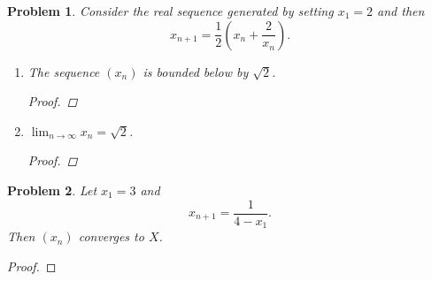\documentclass[12pt]{article}
\newtheorem{problem}{Problem}
\begin{document}
\begin{problem} %
Consider the real sequence generated by setting $x_1=2$ and then
	$$x_{n+1} = \frac{1}{2}\left(x_n + \frac{2}{x_n}\right).$$


\renewcommand{\labelenumi}{(\alph{enumi})}
\begin{enumerate}
\item The sequence $(x_n)$ is bounded below by $\sqrt{2}$.

\begin{proof}
\end{proof}

\item $\lim_{n\to\infty} x_n = \sqrt{2}$.

\begin{proof}
\end{proof}

\end{enumerate}
\end{problem}


\begin{problem} %
Let $x_1=3$ and
	$$x_{n+1} = \frac{1}{4-x_1}.$$
Then $(x_n)$ converges to $X$.
\end{problem}


\begin{proof}
\end{proof}
\end{document}
